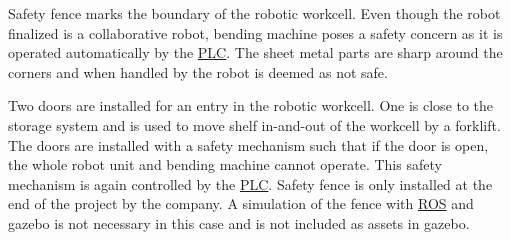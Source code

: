Safety fence marks the boundary of the robotic workcell. Even though the robot finalized is a collaborative robot,
bending machine poses a safety concern as it is operated automatically by the \hyperref[acro:PLC]{PLC}. The sheet metal parts are sharp
around the corners and when handled by the robot is deemed as not safe.

Two doors are installed for an entry in the robotic workcell. One is close to the storage system and is used
to move shelf in-and-out of the workcell by a forklift. The doors are installed with a safety mechanism such that if the door is open, the whole robot unit and bending machine cannot operate. This safety mechanism 
is again controlled by the \hyperref[acro:PLC]{PLC}. Safety fence is only installed at the end of the project by the company.
A simulation of the fence with \hyperref[acro:ROS]{ROS} and gazebo is not necessary in this case and is not included as assets in gazebo.

